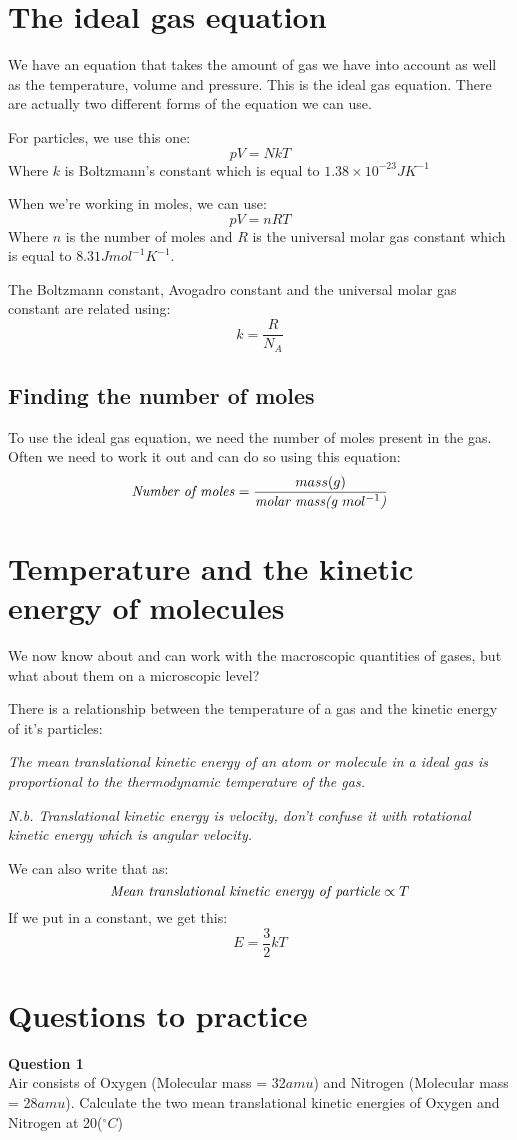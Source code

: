 \documentclass{article}
\begin{document}
\section*{The ideal gas equation}
We have an equation that takes the amount of gas we have into account as well
as the temperature, volume and pressure. This is the ideal gas equation. There
are actually two different forms of the equation we can use.

For particles, we use this one:
\[
	pV = NkT
\]	
Where $k$ is Boltzmann's constant which is equal to
$1.38 \times 10^{-23}JK^{-1}$

When we're working in moles, we can use:
\[
	pV = nRT
\]
Where $n$ is the number of moles and $R$ is the universal molar gas constant
which is equal to $8.31Jmol^{-1}K^{-1}$.

The Boltzmann constant, Avogadro constant and the universal molar gas constant
are related using:
\[
	k = \frac{R}{N_A}
\]

\subsection*{Finding the number of moles}
To use the ideal gas equation, we need the number of moles present in the gas.
Often we need to work it out and can do so using this equation:
\[
	\textrm{\textit{Number of moles}} = \frac{mass(g)}{\textrm{\textit{molar
	mass(g $mol^{-1}$)}}}
\]

\section*{Temperature and the kinetic energy of molecules}
We now know about and can work with the macroscopic quantities of gases, but
what about them on a microscopic level?

There is a relationship between the temperature of a gas and the kinetic energy
of it's particles:

\textit{The mean translational kinetic energy of an atom or molecule in a ideal
gas is proportional to the thermodynamic temperature of the gas.}

\textit{N.b. Translational kinetic energy is velocity, don't confuse it with
rotational kinetic energy which is angular velocity.}

We can also write that as:
\[
	\textrm{\textit{Mean translational kinetic energy of particle}} \propto T
\]
If we put in a constant, we get this:
\[
	E = \frac{3}{2}kT
\]

\section*{Questions to practice}
\textbf{Question 1}\\
Air consists of Oxygen (Molecular mass = 32$amu$) and Nitrogen (Molecular mass =
28$amu$). Calculate the two mean translational kinetic energies of Oxygen and
Nitrogen at 20($^\circ C$)
\end{document}
